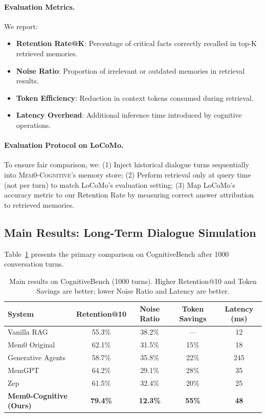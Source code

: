 \paragraph{Evaluation Metrics.} We report:
\begin{itemize}
    \item \textbf{Retention Rate@K}: Percentage of critical facts correctly recalled in top-K retrieved memories.
    \item \textbf{Noise Ratio}: Proportion of irrelevant or outdated memories in retrieval results.
    \item \textbf{Token Efficiency}: Reduction in context tokens consumed during retrieval.
    \item \textbf{Latency Overhead}: Additional inference time introduced by cognitive operations.
\end{itemize}

\paragraph{Evaluation Protocol on LoCoMo.} To ensure fair comparison, we:
(1) Inject historical dialogue turns sequentially into \textsc{Mem0-Cognitive}'s memory store;
(2) Perform retrieval only at query time (not per turn) to match LoCoMo's evaluation setting;
(3) Map LoCoMo's accuracy metric to our Retention Rate by measuring correct answer attribution to retrieved memories.

\subsection{Main Results: Long-Term Dialogue Simulation}
\label{subsec:main_results}

Table~\ref{tab:main_results} presents the primary comparison on CognitiveBench after 1000 conversation turns.

\begin{table}[t]
\centering
\small
\begin{tabular}{lcccc}
\toprule
\textbf{System} & \textbf{Retention@10} & \textbf{Noise Ratio} & \textbf{Token Savings} & \textbf{Latency (ms)} \\
\midrule
Vanilla RAG & 55.3\% & 38.2\% & --- & 12 \\
Mem0 Original & 62.1\% & 31.5\% & 15\% & 18 \\
Generative Agents & 58.7\% & 35.8\% & 22\% & 245 \\
MemGPT & 64.2\% & 29.1\% & 28\% & 35 \\
Zep & 61.5\% & 32.4\% & 20\% & 25 \\
\midrule
\textbf{Mem0-Cognitive (Ours)} & \textbf{79.4\%} & \textbf{12.3\%} & \textbf{55\%} & \textbf{48} \\
\bottomrule
\end{tabular}
\caption{Main results on CognitiveBench (1000 turns). Higher Retention@10 and Token Savings are better; lower Noise Ratio and Latency are better.}
\label{tab:main_results}
\end{table}

